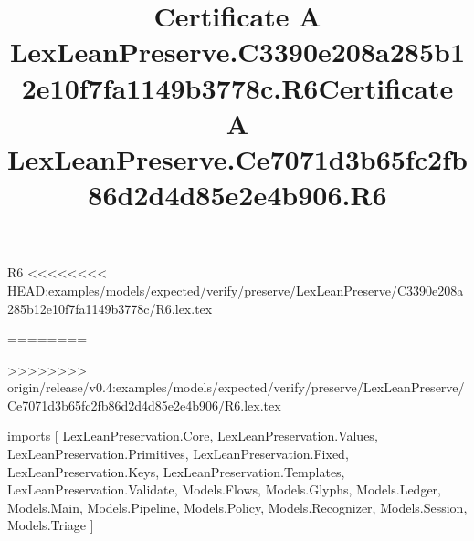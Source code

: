 \begin{lexlean}{R6}
<<<<<<<< HEAD:examples/models/expected/verify/preserve/LexLeanPreserve/C3390e208a285b12e10f7fa1149b3778c/R6.lex.tex
\title{Certificate A LexLeanPreserve.C3390e208a285b12e10f7fa1149b3778c.R6}
========
\title{Certificate A LexLeanPreserve.Ce7071d3b65fc2fb86d2d4d85e2e4b906.R6}
>>>>>>>> origin/release/v0.4:examples/models/expected/verify/preserve/LexLeanPreserve/Ce7071d3b65fc2fb86d2d4d85e2e4b906/R6.lex.tex
\begin{coremodule}
imports [
  LexLeanPreservation.Core,
  LexLeanPreservation.Values,
  LexLeanPreservation.Primitives,
  LexLeanPreservation.Fixed,
  LexLeanPreservation.Keys,
  LexLeanPreservation.Templates,
  LexLeanPreservation.Validate,
  Models.Flows,
  Models.Glyphs,
  Models.Ledger,
  Models.Main,
  Models.Pipeline,
  Models.Policy,
  Models.Recognizer,
  Models.Session,
  Models.Triage
]


\end{coremodule}
\end{lexlean}
